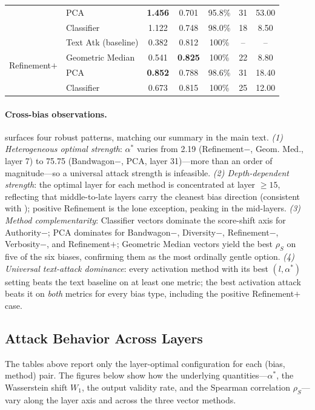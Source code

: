 \documentclass[11pt]{article}
\let\Cref\crtCref
\begin{document}
\begin{table}[h!]
\begin{tabular}{l l c c c c c}
 & PCA & \textbf{1.456} & 0.701 & 95.8\% & 31 & 53.00 \\
 & Classifier & 1.122 & 0.748 & 98.0\% & 18 & 8.50 \\
\midrule
\multirow{4}{*}{Refinement$+$}
 & Text Atk (baseline) & 0.382 & 0.812 & 100\% & -- & -- \\
 & Geometric Median & 0.541 & \textbf{0.825} & 100\% & 22 & 8.80 \\
 & PCA & \textbf{0.852} & 0.788 & 98.6\% & 31 & 18.40 \\
 & Classifier & 0.673 & 0.815 & 100\% & 25 & 12.00 \\
\bottomrule
\end{tabular}
\end{table}

\paragraph{Cross-bias observations.}
\Cref{tab:attack_per_bias} surfaces four robust patterns, matching our summary in the main text. \emph{(1) Heterogeneous optimal strength}: $\alpha^{*}$ varies from 2.19 (Refinement$-$, Geom. Med., layer 7) to 75.75 (Bandwagon$-$, PCA, layer 31)---more than an order of magnitude---so a universal attack strength is infeasible. \emph{(2) Depth-dependent strength}: the optimal layer for each method is concentrated at layer $\geq 15$, reflecting that middle-to-late layers carry the cleanest bias direction (consistent with \Cref{tab:layerwise}); positive Refinement is the lone exception, peaking in the mid-layers. \emph{(3) Method complementarity}: Classifier vectors dominate the score-shift axis for Authority$-$; PCA dominates for Bandwagon$-$, Diversity$-$, Refinement$-$, Verbosity$-$, and Refinement$+$; Geometric Median vectors yield the best $\rho_S$ on five of the six biases, confirming them as the most ordinally gentle option. \emph{(4) Universal text-attack dominance}: every activation method with its best $(l, \alpha^{*})$ setting beats the text baseline on at least one metric; the best activation attack beats it on \emph{both} metrics for every bias type, including the positive Refinement$+$ case.

\subsection{Attack Behavior Across Layers}
\label{app:attack_visualizations}

The tables above report only the layer-optimal configuration for each (bias, method) pair. The figures below show how the underlying quantities---$\alpha^{*}$, the Wasserstein shift $W_1$, the output validity rate, and the Spearman correlation $\rho_S$---vary along the layer axis and across the three vector methods.
\end{document}
